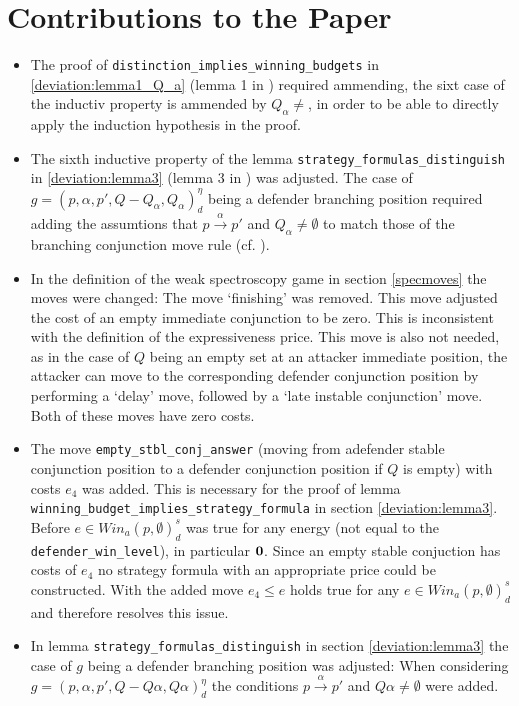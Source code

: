 \section{Contributions to the Paper}
\begin{itemize}
    \item The proof of \texttt{distinction\_implies\_winning\_budgets} in \ref{deviation:lemma1_Q_a} 
    (lemma 1 in \cite{bisping2023lineartimebranchingtime}) required ammending, the sixt case
    of the inductiv property is ammended by $Q_\alpha \neq {}$, in order to be able to directly
    apply the induction hypothesis in the proof.

    \item The sixth inductive property of the lemma \texttt{strategy\_formulas\_distinguish} in \ref{deviation:lemma3} 
    (lemma 3 in \cite{bisping2023lineartimebranchingtime}) was adjusted.
    The case of $g=(p,\alpha ,p', Q- Q_\alpha, Q_\alpha)_d^\eta$ being a defender branching position
    required adding the assumtions that $p \overset{\alpha}{\longrightarrow} p'$ and $Q_\alpha \neq \emptyset$
    to match those of the branching conjunction move rule (cf. \cite[p. 13]{bisping2023lineartimebranchingtime}). 

    \item In the definition of the weak spectroscopy game in section \ref{specmoves} the moves were changed: 
    The move `finishing' was removed. This move adjusted the cost of an empty immediate conjunction to be zero.
    This is inconsistent with the definition of the expressiveness price. This move is also not needed, as in the case of $Q$ being an empty set at an attacker immediate position, the attacker can move to the corresponding
    defender conjunction position by performing a `delay' move, followed by a `late instable conjunction' move. Both of these moves have zero costs.

    \item The move \texttt{empty\_stbl\_conj\_answer} (moving from adefender stable conjunction position to a defender conjunction
    position if $Q$ is empty) with costs $e_4$ was added. This is necessary for the proof of lemma\\ 
    \texttt{winning\_budget\_implies\_strategy\_formula} in section \ref{deviation:lemma3}. Before 
    $e \in Win_a (p, \emptyset)_d^s $ was true for any energy (not equal to the \texttt{defender\_win\_level}), in particular $\bold{0}$. 
    Since an empty stable conjuction has costs of $e_4$ no strategy formula with an appropriate price could be constructed. 
    With the added move $e_4 \leq e $ holds true for any $e \in Win_a (p, \emptyset)_d^s $ and therefore resolves this issue.

    \item In lemma \texttt{strategy\_formulas\_distinguish} in section \ref{deviation:lemma3} the case of $g$ being a defender branching position was adjusted: 
    When considering $g=(p,\alpha ,p', Q- Q \alpha, Q \alpha)_d^\eta$ the conditions $p \overset{\alpha}{\longrightarrow} p'$ and $Q \alpha \neq \emptyset$ were added. 
\end{itemize}
